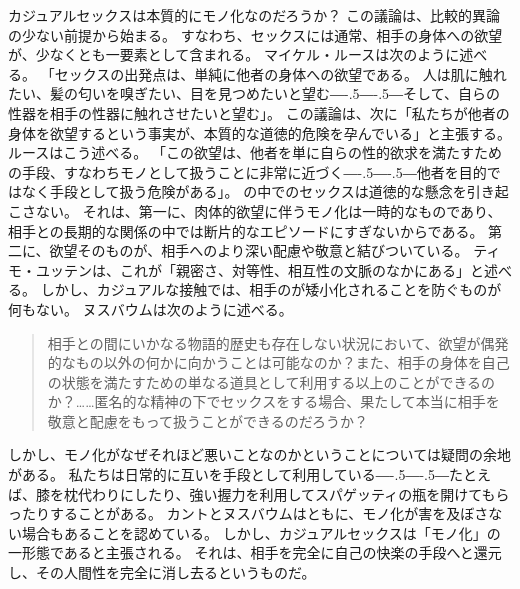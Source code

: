 \documentclass[paper=a4,book,openany]{jlreq}
\def\DDASH{―\kern-.5\zw―\kern-.5\zw―} %
\begin{document}
カジュアルセックスは本質的にモノ化なのだろうか？ この議論は、比較的異論の少ない前提から始まる。
すなわち、セックスには通常、相手の身体への欲望が、少なくとも一要素として含まれる。
マイケル・ルースは次のように述べる。
「セックスの出発点は、単純に他者の身体への欲望である。
人は肌に触れたい、髪の匂いを嗅ぎたい、目を見つめたいと望む{\DDASH}そして、自らの性器を相手の性器に触れさせたいと望む」。
この議論は、次に「私たちが他者の身体を欲望するという事実が、本質的な道徳的危険を孕んでいる」と主張する。
ルースはこう述べる。
「この欲望は、他者を単に自らの性的欲求を満たすための手段、すなわちモノとして扱うことに非常に近づく{\DDASH}他者を目的ではなく手段として扱う危険がある」\citep[p.185]{ruse88:_homos}。
の中でのセックスは道徳的な懸念を引き起こさない。
それは、第一に、肉体的欲望に伴うモノ化は一時的なものであり、相手との長期的な関係の中では断片的なエピソードにすぎないからである。
第二に、欲望そのものが、相手へのより深い配慮や敬意と結びついている。
ティモ・ユッテンは、これが「親密さ、対等性、相互性の文脈のなかにある」と述べる\citep[p.31]{jutten16:_sexual_objec}。
しかし、カジュアルな接触では、相手のが矮小化されることを防ぐものが何もない。
ヌスバウムは次のように述べる。

\begin{quote}
  相手との間にいかなる物語的歴史も存在しない状況において、欲望が偶発的なもの以外の何かに向かうことは可能なのか？また、相手の身体を自己の状態を満たすための単なる道具として利用する以上のことができるのか？……匿名的な精神の下でセックスをする場合、果たして本当に相手を敬意と配慮をもって扱うことができるのだろうか？\citep[p.287]{nussbaum95:_objec}
\end{quote}

しかし、モノ化がなぜそれほど悪いことなのかということについては疑問の余地がある。
私たちは日常的に互いを手段として利用している{\DDASH}たとえば、膝を枕代わりにしたり、強い握力を利用してスパゲッティの瓶を開けてもらったりすることがある。
カントとヌスバウムはともに、モノ化が害を及ぼさない場合もあることを認めている。
しかし、カジュアルセックスは「モノ化」の一形態であると主張される。
それは、相手を完全に自己の快楽の手段へと還元し、その人間性を完全に消し去るというものだ。
\end{document}
